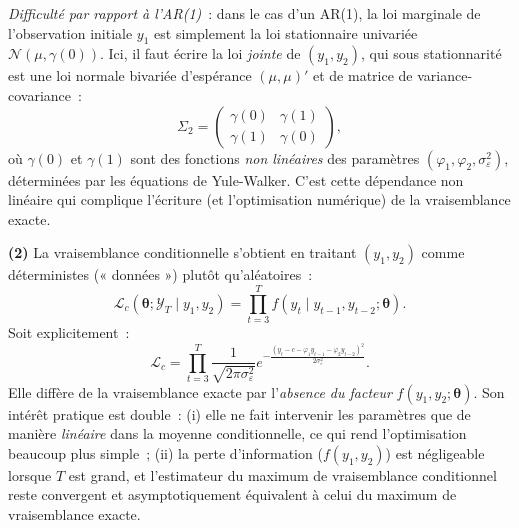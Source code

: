 \documentclass[11pt,a4paper,notitlepage]{article}
\newcommand{\question}[1]{\textbf{(#1)}}
\begin{document}
\textit{Difficulté par rapport à l'AR(1)}~: dans le cas d'un AR(1), la
loi marginale de l'observation initiale $y_1$ est simplement la loi
stationnaire univariée $\mathcal N(\mu,\gamma(0))$. Ici, il faut
écrire la loi \emph{jointe} de $(y_1,y_2)$, qui sous stationnarité est
une loi normale bivariée d'espérance $(\mu,\mu)'$ et de matrice de
variance-covariance~:
\[
\Sigma_2 = \begin{pmatrix} \gamma(0) & \gamma(1) \\ \gamma(1) & \gamma(0) \end{pmatrix},
\]
où $\gamma(0)$ et $\gamma(1)$ sont des fonctions \emph{non linéaires} des
paramètres $(\varphi_1,\varphi_2,\sigma_{\varepsilon}^2)$, déterminées
par les équations de Yule-Walker. C'est cette dépendance non linéaire
qui complique l'écriture (et l'optimisation numérique) de la
vraisemblance exacte.\newline

\question{2} La vraisemblance conditionnelle s'obtient en traitant
$(y_1,y_2)$ comme déterministes (« données ») plutôt qu'aléatoires~:
\[
\mathcal L_c(\bm\theta;\mathcal Y_T \mid y_1,y_2)
= \prod_{t=3}^T f(y_t\mid y_{t-1},y_{t-2};\bm\theta).
\]
Soit explicitement~:
\[
\mathcal L_c = \prod_{t=3}^T \frac{1}{\sqrt{2\pi\sigma_{\varepsilon}^2}}
e^{-\frac{(y_t - c - \varphi_1 y_{t-1} - \varphi_2 y_{t-2})^2}{2\sigma_{\varepsilon}^2}}.
\]
Elle diffère de la vraisemblance exacte par l'\emph{absence du
facteur} $f(y_1,y_2;\bm\theta)$. Son intérêt pratique est double~:
(i) elle ne fait intervenir les paramètres que de manière
\emph{linéaire} dans la moyenne conditionnelle, ce qui rend
l'optimisation beaucoup plus simple~; (ii) la perte d'information
($f(y_1,y_2)$) est négligeable lorsque $T$ est grand, et
l'estimateur du maximum de vraisemblance conditionnel reste convergent
et asymptotiquement équivalent à celui du maximum de vraisemblance
exacte.\newline
\end{document}

